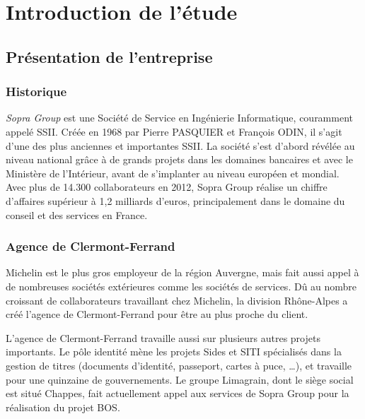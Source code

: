 \cleardoublepage

\chapter{Introduction de l'étude}


\section{Présentation de l'entreprise}


\subsection{Historique}

\textit{Sopra Group} est une Société de Service en Ingénierie Informatique, couramment appelé SSII.
Créée en 1968 par Pierre PASQUIER et François ODIN, il s'agit d'une des plus anciennes et importantes SSII.
La société s'est d'abord révélée au niveau national grâce à de grands projets dans les domaines bancaires et avec le Ministère de l'Intérieur, avant de s'implanter au niveau européen et mondial.
Avec plus de 14.300 collaborateurs en 2012, Sopra Group réalise un chiffre d'affaires supérieur à 1,2 milliards d'euros, principalement dans le domaine du conseil et des services en France.


\subsection{Agence de Clermont-Ferrand}

Michelin est le plus gros employeur de la région Auvergne, mais fait aussi appel à de nombreuses sociétés extérieures comme les sociétés de services.
Dû au nombre croissant de collaborateurs travaillant chez Michelin, la division Rhône-Alpes a créé l'agence de Clermont-Ferrand pour être au plus proche du client.

L'agence de Clermont-Ferrand travaille aussi sur plusieurs autres projets importants.
Le pôle identité mène les projets Sides et SITI spécialisés dans la gestion de titres (documents d'identité, passeport, cartes à puce, \ldots), et travaille pour une quinzaine de gouvernements.
Le groupe Limagrain, dont le siège social est situé Chappes, fait actuellement appel aux services de Sopra Group pour la réalisation du projet BOS.